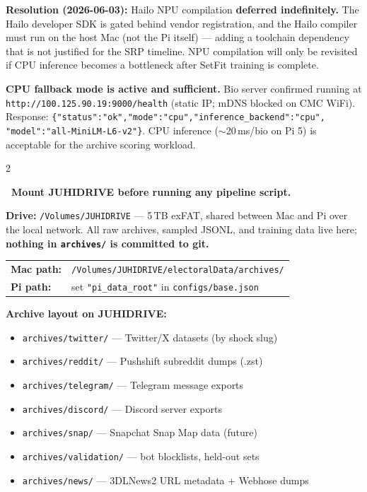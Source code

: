 \documentclass[11pt]{article}
\begin{document}
\begin{taskbox}
{  \smallskip
  \textbf{Resolution (2026-06-03):} Hailo NPU compilation \textbf{deferred
  indefinitely.} The Hailo developer SDK is gated behind vendor registration,
  and the Hailo compiler must run on the host Mac (not the Pi itself) ---
  adding a toolchain dependency that is not justified for the SRP timeline.
  NPU compilation will only be revisited if CPU inference becomes a bottleneck
  after SetFit training is complete.

  \smallskip
  \textbf{CPU fallback mode is active and sufficient.} Bio server confirmed
  running at \texttt{http://100.125.90.19:9000/health} (static IP; mDNS
  blocked on CMC WiFi). Response:
  \texttt{\{"status":"ok","mode":"cpu","inference\_backend":"cpu",}%
  \texttt{"model":"all-MiniLM-L6-v2"\}}.
  CPU inference ($\sim$20\,ms/bio on Pi 5) is acceptable for the archive
  scoring workload.}{2}

\begin{mdframed}[backgroundcolor=warn, linecolor=darkblue, linewidth=1.5pt,
  innerleftmargin=12pt, innerrightmargin=12pt, innertopmargin=10pt, innerbottommargin=10pt]
\textbf{\large \textrightarrow\ Mount JUHIDRIVE before running any pipeline script.}

\smallskip
\textbf{Drive:} \texttt{/Volumes/JUHIDRIVE} --- 5\,TB exFAT, shared between Mac and
Pi over the local network.
All raw archives, sampled JSONL, and training data live here;
\textbf{nothing in \texttt{archives/} is committed to git.}

\medskip
\begin{tabular}{@{}ll@{}}
  \textbf{Mac path:} & \texttt{/Volumes/JUHIDRIVE/electoralData/archives/} \\
  \textbf{Pi path:}  & set \texttt{"pi\_data\_root"} in \texttt{configs/base.json} \\
\end{tabular}

\medskip
\textbf{Archive layout on JUHIDRIVE:}
\begin{itemize}[leftmargin=1.6em, itemsep=1pt]
  \item \texttt{archives/twitter/}    --- Twitter/X datasets (by shock slug)
  \item \texttt{archives/reddit/}     --- Pushshift subreddit dumps (.zst)
  \item \texttt{archives/telegram/}   --- Telegram message exports
  \item \texttt{archives/discord/}    --- Discord server exports
  \item \texttt{archives/snap/}       --- Snapchat Snap Map data (future)
  \item \texttt{archives/validation/} --- bot blocklists, held-out sets
  \item \texttt{archives/news/}       --- 3DLNews2 URL metadata + Webhose dumps
\end{itemize}


\end{mdframed}
\end{taskbox}
\end{document}

